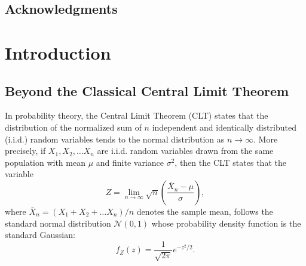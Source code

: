 \documentclass[11pt, letter]{book}
\newcommand{\lp}{\left(}
\newcommand{\rp}{\right)}
\newcommand{\f}[2]{\frac{#1}{#2}}
\begin{document}
\newpage
\section*{Acknowledgments} 



\tableofcontents

\listoffigures




\chapter{Introduction}\label{chap:intro}






\section{Beyond the Classical Central Limit Theorem}






In probability theory, the Central Limit Theorem (CLT) states that the distribution of the normalized sum of $n$ independent and identically distributed (i.i.d.) random variables tends to the normal distribution as $n\to \infty$. More precisely, if $X_1, X_2, \dots X_n$ are i.i.d. random variables drawn from the same population with mean $\mu$ and finite variance $\sigma^2$, then the CLT states that the variable
\begin{equation*}
    Z = \lim_{n\to \infty} \sqrt{n}\lp \f{\bar{X}_n - \mu}{\sigma} \rp,
\end{equation*}
where $\bar{X}_n = (X_1 + X_2 + \dots X_n)/n$ denotes the sample mean, follows the standard normal distribution $\mathcal{N}(0,1)$ whose probability density function is the standard Gaussian:
\begin{equation*}
    f_Z(z) = \f{1}{\sqrt{2\pi}} e^{-z^2/2}.
\end{equation*}
\end{document}
